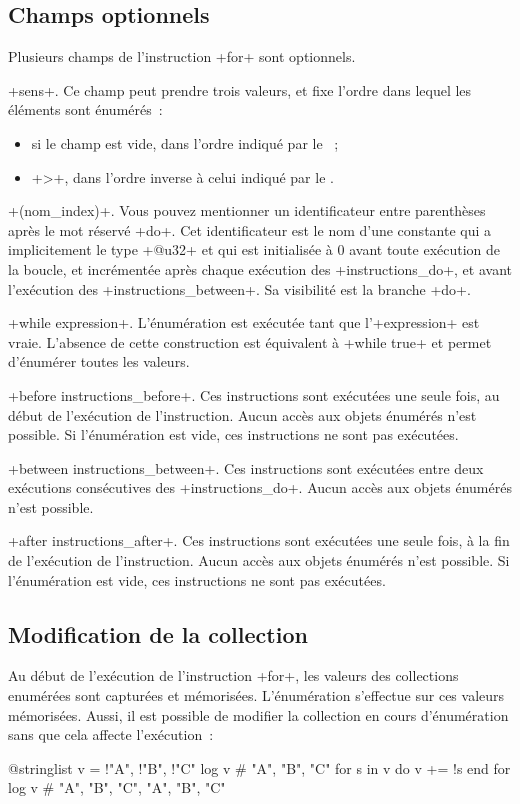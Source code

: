 \subsection{Champs optionnels}

Plusieurs champs de l'instruction \ggsq+for+ sont optionnels.


\ggsq+sens+. Ce champ peut prendre trois valeurs, et fixe l'ordre dans lequel les éléments sont énumérés~:
\begin{itemize}
  \item si le champ est vide, dans l'ordre indiqué par le ~;
  \item \ggsq+>+, dans l'ordre inverse à celui indiqué par le .
\end{itemize}


\ggsq+(nom_index)+. Vous pouvez mentionner un identificateur entre parenthèses après le mot réservé \ggsq+do+. Cet identificateur est le nom d'une constante qui a implicitement le type \ggsq+@u32+ et qui est initialisée à 0 avant toute exécution de la boucle, et incrémentée après chaque exécution des \ggsq+instructions_do+, et avant l'exécution des \ggsq+instructions_between+. Sa visibilité est la branche \ggsq+do+.

\ggsq+while expression+. L'énumération est exécutée tant que l'\ggsq+expression+ est vraie. L'absence de cette construction est équivalent à \ggsq+while true+ et permet d'énumérer toutes les valeurs.


\ggsq+before instructions_before+. Ces instructions sont exécutées une seule fois, au début de l'exécution de l'instruction. Aucun accès aux objets énumérés n'est possible. Si l'énumération est vide, ces instructions ne sont pas exécutées.

\ggsq+between instructions_between+. Ces instructions sont exécutées entre deux exécutions consécutives des \ggsq+instructions_do+. Aucun accès aux objets énumérés n'est possible.

\ggsq+after instructions_after+. Ces instructions sont exécutées une seule fois, à la fin de l'exécution de l'instruction. Aucun accès aux objets énumérés n'est possible. Si l'énumération est vide, ces instructions ne sont pas exécutées.


\subsection{Modification de la collection}

Au début de l'exécution de l'instruction \ggsq+for+, les valeurs des collections enumérées sont capturées et mémorisées. L'énumération s'effectue sur ces valeurs mémorisées. Aussi, il est possible de modifier la collection en cours d'énumération sans que cela affecte l'exécution~:
\begin{galgas4}
@stringlist v = {!"A", !"B", !"C"}
log v # "A", "B", "C"
for s in v do
  v += !s
end for
log v # "A", "B", "C", "A", "B", "C"
\end{galgas4}












